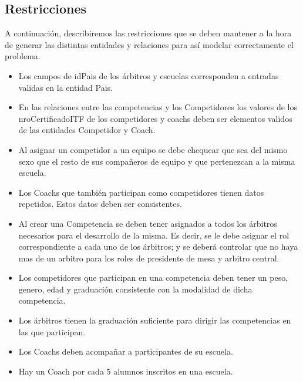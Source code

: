 \subsection{Restricciones}

A continuación, describiremos las restricciones que se deben mantener a la hora de generar las distintas entidades y relaciones para así modelar correctamente el problema.

\begin{itemize}
\item Los campos de idPais de los árbitros y escuelas corresponden a entradas validas en la entidad Pais.
\item En las relaciones entre las competencias y los Competidores los valores de los nroCertificadoITF de los competidores y coachs deben ser elementos validos de las entidades Competidor y Coach.
\item Al asignar un competidor a un equipo se debe chequear que sea del mismo sexo que el resto de sus compañeros de equipo y que pertenezcan a la misma escuela.
\item Los Coachs que también participan como competidores tienen datos repetidos. Estos datos deben ser consistentes.
\item Al crear una Competencia se deben tener asignados a todos los árbitros necesarios para el desarrollo de la misma. Es decir, se le debe asignar el rol correspondiente a cada uno de los árbitros; y se deberá controlar que no haya mas de un arbitro para los roles de presidente de mesa y arbitro central.
\item Los competidores que participan en una competencia deben tener un peso, genero, edad y graduación consistente con la modalidad de dicha competencia.
\item Los árbitros tienen la graduación suficiente para dirigir las competencias en las que participan.
\item Los Coachs deben acompañar a participantes de su escuela.
\item Hay un Coach por cada 5 alumnos inscritos en una escuela.
\end{itemize}